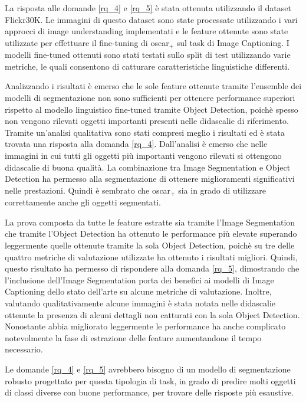 La risposta alle domande \ref{rq_4} e \ref{rq_5} è stata ottenuta utilizzando il dataset Flickr30K. 
Le immagini di questo dataset sono state processate utilizzando i vari approcci di image understanding implementati e le feature ottenute sono state utilizzate per effettuare il fine-tuning di \acrshort{oscar}$_+$ sul task di Image Captioning. I modelli fine-tuned ottenuti sono stati testati sullo split di test utilizzando varie metriche, le quali consentono di catturare caratteristiche linguistiche differenti.

Analizzando i risultati è emerso che le sole feature ottenute tramite l'ensemble dei modelli di segmentazione non sono sufficienti per ottenere performance superiori rispetto al modello linguistico fine-tuned tramite Object Detection, poichè spesso non vengono rilevati oggetti importanti presenti nelle didascalie di riferimento. Tramite un'analisi qualitativa sono stati compresi meglio i risultati ed è stata trovata una risposta alla domanda \ref{rq_4}. Dall'analisi è emerso che nelle immagini in cui tutti gli oggetti più importanti vengono rilevati si ottengono didascalie di buona qualità. 
La combinazione tra Image Segmentation e Object Detection ha permesso alla segmentazione di ottenere miglioramenti significativi nelle prestazioni. Quindi è sembrato che \acrshort{oscar}$_+$ sia in grado di utilizzare correttamente anche gli oggetti segmentati.


La prova composta da tutte le feature estratte sia tramite l'Image Segmentation che tramite l'Object Detection ha ottenuto le performance più elevate superando leggermente quelle ottenute tramite la sola Object Detection, poichè su tre delle quattro metriche di valutazione utilizzate ha ottenuto i risultati migliori. Quindi, questo risultato ha permesso di rispondere alla domanda \ref{rq_5}, dimostrando che l'inclusione dell'Image Segmentation porta dei benefici ai modelli di Image Captioning dello stato dell'arte su alcune metriche di valutazione. Inoltre, valutando qualitativamente alcune immagini è stata notata nelle didascalie ottenute la presenza di alcuni dettagli non catturati con la sola Object Detection.
Nonostante abbia migliorato leggermente le performance ha anche complicato notevolmente la fase di estrazione delle feature aumentandone il tempo necessario.


Le domande \ref{rq_4} e \ref{rq_5} avrebbero bisogno di un modello di segmentazione robusto progettato per questa tipologia di task, in grado di predire molti oggetti di classi diverse con buone performance, per trovare delle risposte più esaustive.